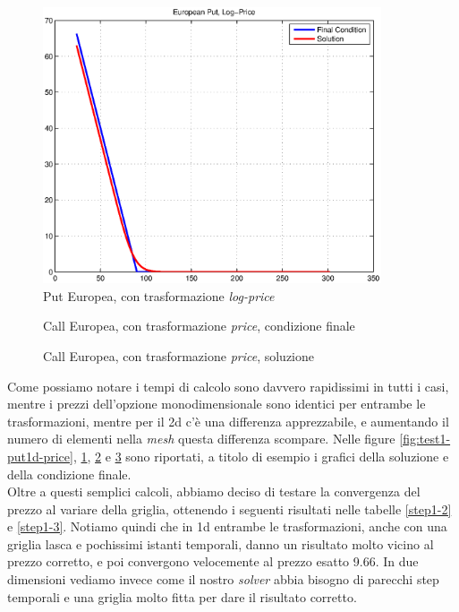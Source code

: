 \documentclass[a4paper,10pt]{report}
\theoremstyle{plain}
\theoremstyle{definition}
\theoremstyle{remark}
\begin{document}
\begin{figure}[htp!]
\begin{center}
\includegraphics[width=10cm]{img/test1-put1dlogprice.eps}
\caption{Put Europea, con trasformazione \emph{log-price}}
\label{fig:test1-put1d-logprice}
\end{center}
\end{figure}
\begin{figure}[htp!]
\begin{center}
\caption{Call Europea, con trasformazione \emph{price}, condizione finale}
\label{fig:test1-call1d-fc}
\end{center}
\end{figure}
\begin{figure}[htp!]
\begin{center}
\caption{Call Europea, con trasformazione \emph{price}, soluzione}
\label{fig:test1-call1d-sol}
\end{center}
\end{figure}
Come possiamo notare i tempi di calcolo sono davvero rapidissimi in tutti i casi, mentre i prezzi dell'opzione monodimensionale sono identici per entrambe le trasformazioni, mentre per il 2d c'\`e una differenza apprezzabile, e aumentando il numero di elementi nella \emph{mesh} questa differenza scompare.
Nelle figure \ref{fig:test1-put1d-price}, \ref{fig:test1-put1d-logprice}, \ref{fig:test1-call1d-fc} e \ref{fig:test1-call1d-sol} sono riportati, a titolo di esempio i grafici della soluzione e della condizione finale.\\Oltre a questi semplici calcoli, abbiamo deciso di testare la convergenza del prezzo al variare della griglia, ottenendo i seguenti risultati nelle tabelle \ref{step1-2} e \ref{step1-3}. Notiamo quindi che in 1d entrambe le trasformazioni, anche con una griglia lasca e pochissimi istanti temporali, danno un risultato molto vicino al prezzo corretto, e poi convergono velocemente al prezzo esatto 9.66. In due dimensioni vediamo invece come il nostro \emph{solver} abbia bisogno di parecchi step temporali e una griglia molto fitta per dare il risultato corretto.
\end{document}
